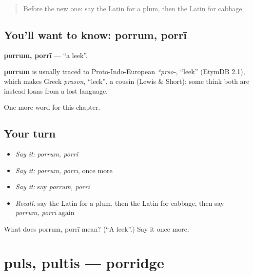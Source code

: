 \label{lesson:LA-C279-porrum}



\begin{quote}
Before the new one: say the Latin for a plum, then the Latin for cabbage.
\end{quote}

\subsection*{You'll want to know: porrum, porrī}
\textbf{porrum, porrī} — \textquotedblleft{}a leek\textquotedblright{}.

\begin{cousinweb}
\textbf{porrum} is usually traced to Proto-Indo-European \emph{*prso-}, \textquotedblleft{}leek\textquotedblright{} (EtymDB 2.1), which makes Greek \emph{prason}, \textquotedblleft{}leek\textquotedblright{}, a cousin (Lewis \& Short); some think both are instead loans from a lost language.
\end{cousinweb}

\begin{grammarlens}[title={What you've built}]
One more word for this chapter.
\end{grammarlens}

\subsection*{Your turn}
\begin{itemize}
\raggedright
  \item \emph{Say it:} \emph{porrum, porrī}
  \item \emph{Say it:} \emph{porrum, porrī}, once more
  \item \emph{Say it:} say \emph{porrum, porrī}
  \item \emph{Recall:} say the Latin for a plum, then the Latin for cabbage, then say \emph{porrum, porrī} again
\end{itemize}

\begin{tcolorbox}[breakable,colback=teal!4,colframe=teal!35!black,title={Before you move on}]
What does porrum, porrī mean? (\textquotedblleft{}A leek\textquotedblright{}.) Say it once more.
\end{tcolorbox}
\section[puls, pultis]{puls, pultis — porridge}

